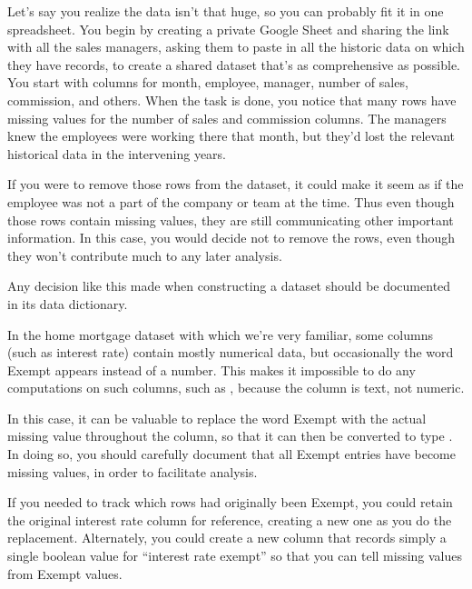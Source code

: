 \documentclass[letterpaper,10pt,english]{jupyterBook}
\begin{document}
\sphinxAtStartPar
Let’s say you realize the data isn’t that huge, so you can probably fit it in one spreadsheet.  You begin by creating a private Google Sheet and sharing the link with all the sales managers, asking them to paste in all the historic data on which they have records, to create a shared dataset that’s as comprehensive as possible.  You start with columns for month, employee, manager, number of sales, commission, and others.  When the task is done, you notice that many rows have missing values for the number of sales and commission columns.  The managers knew the employees were working there that month, but they’d lost the relevant historical data in the intervening years.

\sphinxAtStartPar
If you were to remove those rows from the dataset, it could make it seem as if the employee was not a part of the company or team at the time.  Thus even though those rows contain missing values, they are still communicating other important information.  In this case, you would decide not to remove the rows, even though they won’t contribute much to any later analysis.

\sphinxAtStartPar
Any decision like this made when constructing a dataset should be documented in its data dictionary.

\sphinxAtStartPar
{}

\sphinxAtStartPar
In the home mortgage dataset with which we’re very familiar, some columns (such as interest rate) contain mostly numerical data, but occasionally the word Exempt appears instead of a number.  This makes it impossible to do any computations on such columns, such as , because the column is text, not numeric.

\sphinxAtStartPar
In this case, it can be valuable to replace the word Exempt with the actual missing value  throughout the column, so that it can then be converted to type .  In doing so, you should carefully document that all Exempt entries have become missing values, in order to facilitate analysis.  

\sphinxAtStartPar
If you needed to track which rows had originally been Exempt, you could retain the original interest rate column for reference, creating a new one as you do the replacement.  Alternately, you could create a new column that records simply a single boolean value for “interest rate exempt” so that you can tell missing values from Exempt values.
\end{document}
